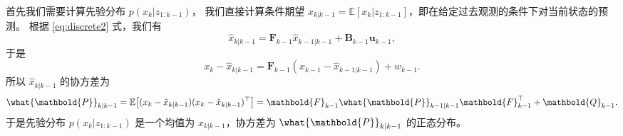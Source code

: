 \documentclass[fontset=none,zihao=-4]{Notes}
\newcommand{\mat}[1]{\mathbold{#1}}
\begin{document}
首先我们需要计算先验分布 $p(x_k|z_{1:k-1})$，
我们直接计算条件期望 $\hat x_{k|k-1}=\mathbb{E}[x_k|z_{1:k-1}]$，即在给定过去观测的条件下对当前状态的预测。
根据 \eqref{eq:discrete2} 式，我们有
\begin{equation}\label{eq:predict}
  \hat x_{k|k-1}=\mat F_{k-1}\hat x_{k-1|k-1}+\mat B_{k-1}\mat u_{k-1},
\end{equation}
于是
\[
  x_k-\hat x_{k|k-1}=\mat F_{k-1}(x_{k-1}-\hat x_{k-1|k-1})+w_{k-1}.
\]
所以 $\hat x_{k|k-1}$ 的协方差为
\begin{equation}\label{eq:predict_cov}
  \what{\mat P}_{k|k-1}=\mathbb{E}\bigl[(x_k-\hat x_{k|k-1})(x_k-\hat x_{k|k-1})^\top\bigr]
  =\mat F_{k-1}\what{\mat P}_{k-1|k-1}\mat F_{k-1}^\top+\mat Q_{k-1}.
\end{equation}
于是先验分布 $p(x_k|z_{1:k-1})$ 是一个均值为 $\hat x_{k|k-1}$，协方差为 $\what{\mat P}_{k|k-1}$ 的正态分布。
\end{document}
